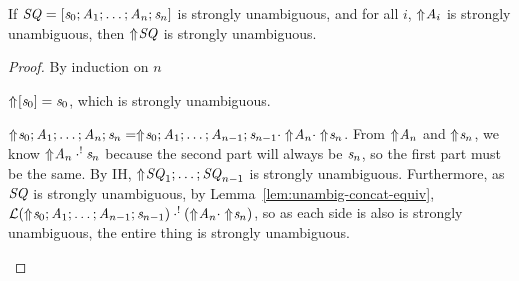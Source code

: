 \documentclass[numbers,10pt,preprint\ifanon ,nocopyrightspace\fi]{sigplanconf}
\begin{document}
\begin{lemma}
  \label{lem:unambig-seq}
  If $\mathit{SQ} = [\mathit{s}_0;\mathit{A}_1;\ldots;\mathit{A}_n;\mathit{s}_n]$
  is strongly unambiguous, and for all $i$, $\Uparrow\mkern-4mu \mathit{A}_i$ is strongly
  unambiguous, then $\Uparrow\mkern-4mu \mathit{SQ}$ is strongly unambiguous.
\end{lemma}
\begin{proof}
  By induction on $n$

  \begin{case}[$n=0$]
    $\Uparrow\mkern-4mu [\mathit{s}_0] = \mathit{s}_0$, which is strongly unambiguous.
  \end{case}

  \begin{case}[$n>0$]
    $\Uparrow\mkern-4mu \mathit{s}_0;\mathit{A}_1;\ldots;\mathit{A}_n;\mathit{s}_n =
    \Uparrow\mkern-4mu \mathit{s}_0;\mathit{A}_1;\ldots;\mathit{A}_{n-1};\mathit{s}_{n-1}
    \cdot \Uparrow\mkern-4mu \mathit{A}_n \cdot \Uparrow\mkern-4mu \mathit{s}_n$.
    From $\Uparrow\mkern-4mu \mathit{A}_n$ and $\Uparrow\mkern-4mu \mathit{s}_n$,
    we know $\Uparrow\mkern-4mu \mathit{A}_n \cdot^! \mathit{s}_n$ because
    the second part will always be $\mathit{s}_n$, so the first part must be the
    same.
    By IH, $\Uparrow\mkern-4mu \mathit{SQ}_1;\ldots;\mathit{SQ}_{n-1}$ is strongly
    unambiguous.
    Furthermore, as $\mathit{SQ}$ is strongly unambiguous,
    by Lemma~\ref{lem:unambig-concat-equiv},
    $\mathcal{L}(\Uparrow\mkern-4mu \mathit{s}_0;\mathit{A}_1;\ldots;\mathit{A}_{n-1};\mathit{s}_{n-1})
    \cdot^!
    (\Uparrow\mkern-4mu \mathit{A}_n \cdot \Uparrow\mkern-4mu \mathit{s}_n)$, so
    as each side is also is strongly unambiguous, the entire thing is
    strongly unambiguous.
  \end{case}
\end{proof}
\end{document}
